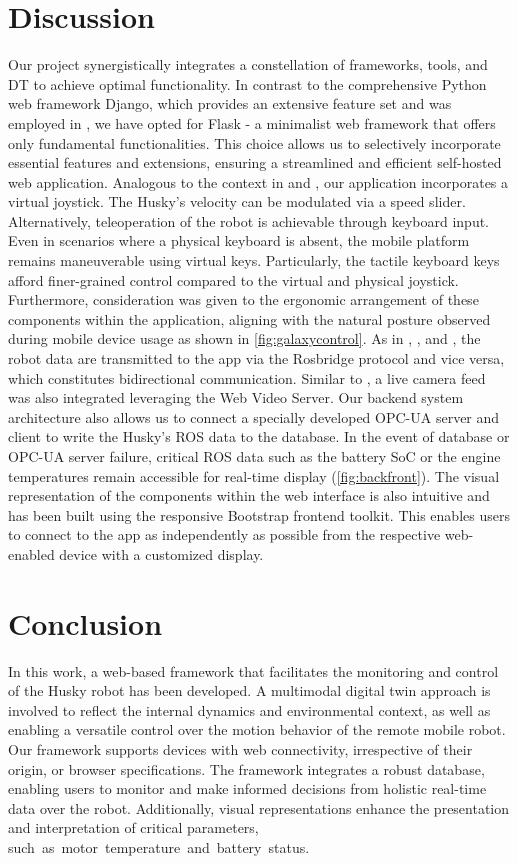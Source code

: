 \documentclass[conference]{IEEEtran}
\begin{document}
\section{Discussion}
Our project synergistically integrates a constellation of frameworks, tools, and DT to achieve optimal functionality. In contrast to the comprehensive Python web framework Django, which provides an extensive feature set \cite{django} and was employed in \cite{kapic}, we have opted for Flask - a minimalist web framework that offers only fundamental functionalities. 
This choice allows us to selectively incorporate essential features and extensions, ensuring a streamlined and efficient self-hosted web application. 
Analogous to the context in \cite{kapic} and \cite{dinodi}, our application incorporates a virtual joystick.
The Husky's velocity can be modulated via a speed slider. Alternatively, teleoperation of the robot is achievable through keyboard input. Even in scenarios where a physical keyboard is absent, the mobile platform remains maneuverable using virtual keys. Particularly, the tactile keyboard keys afford finer-grained control compared to the virtual and physical joystick. 
Furthermore, consideration was given to the ergonomic arrangement of these components within the application, aligning with the natural posture observed during mobile device usage as shown in  \cref{fig:galaxycontrol}.
As in \cite{kapic}, \cite{dinodi}, \cite{johnson} and \cite{wang}, the robot data are transmitted to the app via the Rosbridge protocol and vice versa, which constitutes bidirectional communication. Similar to \cite{johnson}, a live camera feed was also integrated leveraging the Web Video Server.
Our backend system architecture also allows us to connect a specially developed OPC-UA server and client to write the Husky's ROS data to the database. In the event of database or OPC-UA server failure, critical ROS data such as the battery SoC or the engine temperatures remain accessible for real-time display (\cref{fig:backfront}).
The visual representation of the components within the web interface is also intuitive and has been built using the responsive Bootstrap frontend toolkit. This enables users to connect to the app as independently as possible from the respective web-enabled device with a customized display.

\section{Conclusion}
In this work, a web-based framework that facilitates the monitoring and control of the Husky robot has been developed. A multimodal digital twin approach is involved to reflect the internal dynamics and environmental context, as well as enabling a versatile control over the motion behavior of the remote mobile robot. 
Our framework supports devices with web connectivity, irrespective of their origin, or browser specifications. The framework integrates a robust database, enabling users to monitor and make  informed decisions from holistic real-time data over the robot. 
Additionally, visual representations enhance the presentation and interpretation of critical parameters, \mbox{such as motor temperature and battery status.}
\end{document}
